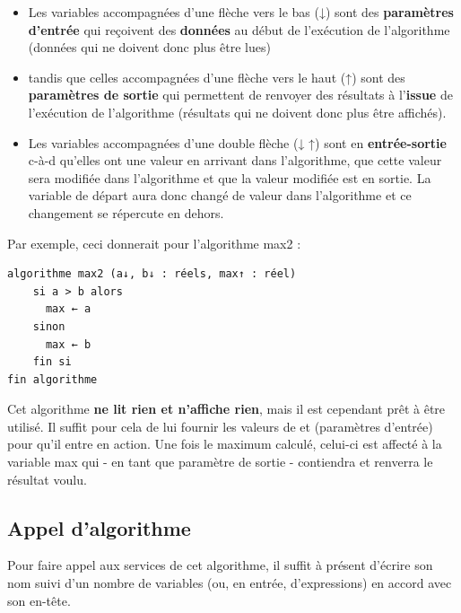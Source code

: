 \documentclass[11pt,a4paper]{article}
\begin{document}
            \par
        
					\begin{itemize}
				
			\item 
            Les variables accompagn\'ees d'une fl\`eche vers le bas (↓) sont des \textbf{param\`etres d'entr\'ee} qui
            re\c coivent des \textbf{donn\'ees} au d\'ebut de l'ex\'ecution de l'algorithme (donn\'ees qui ne doivent donc plus
            \^etre lues) 
          
			\item 
            tandis que celles accompagn\'ees d'une fl\`eche vers le haut (↑) sont des \textbf{param\`etres
            de sortie} qui permettent de renvoyer des r\'esultats \`a l'\textbf{issue} de l'ex\'ecution de l'algorithme
            (r\'esultats qui ne doivent donc plus \^etre affich\'es). 
          
			\item 
            Les variables accompagn\'ees d'une double fl\`eche (↓ ↑) sont en\textbf{ entr\'ee-sortie} c-\`a-d qu'elles ont une valeur
            en arrivant dans l'algorithme, que cette valeur sera modifi\'ee dans l'algorithme et que la valeur modifi\'ee est en sortie. 
            La variable de d\'epart aura donc chang\'e de valeur dans l'algorithme et ce changement se r\'epercute en dehors.
          
					\end{itemize}
				
            \par
        Par exemple, ceci donnerait pour l'algorithme max2 : 
            \par
        \begin{verbatim}
algorithme max2 (a↓, b↓ : réels, max↑ : réel)
    si a > b alors
      max ← a
    sinon
      max ← b
    fin si
fin algorithme
      \end{verbatim}
        Cet algorithme \textbf{ne lit rien et n'affiche rien},
        mais il est cependant pr\^et \`a \^etre utilis\'e. Il suffit pour cela de lui fournir les valeurs de \verb@a@ 
        et \verb@b@ (param\`etres d'entr\'ee) pour qu'il entre en action. Une fois le maximum calcul\'e, celui-ci est
        affect\'e \`a la variable max qui - en tant que param\`etre de sortie - contiendra et renverra le
        r\'esultat voulu.
      
            \par
        \subsection{Appel d'algorithme}
        Pour faire appel aux services de cet algorithme, il suffit \`a pr\'esent d'\'ecrire son nom suivi d'un
        nombre de variables (ou, en entr\'ee, d'expressions) en accord avec son en-t\^ete. 
      
\end{document}
